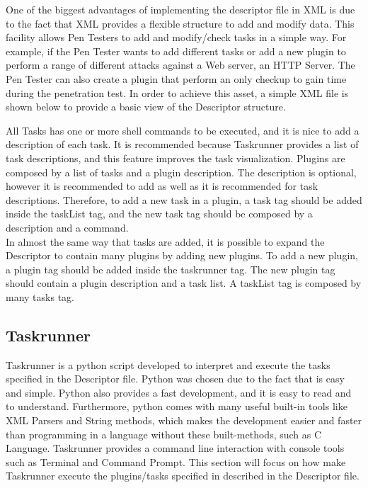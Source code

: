 \documentclass[a4paper, 12pt]{article}
\begin{document}
	One of the biggest advantages of implementing the descriptor file in XML is due to the fact that XML provides a flexible structure to add and modify
data. This facility allows Pen Testers to add and modify/check tasks in a simple way. For example, if the Pen Tester wants to add different tasks or
add a new plugin to perform a range of different attacks against a Web server, an HTTP Server. The Pen Tester can also create a plugin that perform an
only checkup to gain time during the penetration test. In order to achieve this asset, a simple XML file is shown below to provide a basic view of the
Descriptor structure.\\

\clearpage



	All Tasks has one or more shell commands to be executed, and it is nice to add a description of each task. It is recommended because Taskrunner provides
a list of task descriptions, and this feature improves the task visualization. Plugins are composed by a list of tasks and a plugin description. The
description is optional, however it is recommended to add as well as it is recommended for task descriptions. Therefore, to add a new task in a plugin,
a task tag should be added inside the taskList tag, and the new task tag should be composed by a description and a command.\\

	In almost the same way that tasks are added, it is possible to expand the Descriptor to contain many plugins by adding new plugins. To add a new plugin,
a plugin tag should be added inside the taskrunner tag. The new plugin tag should contain a plugin description and a task list. A taskList tag is
composed by many tasks tag.\\

\subsection{Taskrunner}

	Taskrunner is a python script developed to interpret and execute the tasks specified in the Descriptor file. Python was chosen due to the fact that is
easy and simple. Python also provides a fast development, and it is easy to read and to understand. Furthermore, python comes with many useful built-in
tools like XML Parsers and String methods, which makes the development easier and faster than programming in a language without these built-methods,
such as C Language. Taskrunner provides a command line interaction with console tools such as Terminal and Command Prompt. This section will focus on
how make Taskrunner execute the plugins/tasks specified in described in the Descriptor file.\\
\end{document}
